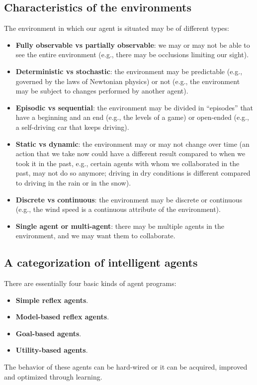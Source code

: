 \subsection{Characteristics of the environments}
The environment in which our agent is situated may be of different types:
\begin{itemize}
    \item \textbf{Fully observable vs partially observable}: we may or may not be able to see the entire environment (e.g., there may be occlusions limiting our sight).
    \item \textbf{Deterministic vs stochastic}: the environment may be predictable (e.g., governed by the laws of Newtonian physics) or not (e.g., the environment may be subject to changes performed by another agent).
    \item \textbf{Episodic vs sequential}: the environment may be divided in “episodes” that have a beginning and an end (e.g., the levels of a game) or open-ended (e.g., a self-driving car that keeps driving).
    \item \textbf{Static vs dynamic}: the environment may or may not change over time (an action that we take now could have a different result compared to when we took it in the past, e.g., certain agents with whom we collaborated in the past, may not do so anymore; driving in dry conditions is different compared to driving in the rain or in the snow).
    \item \textbf{Discrete vs continuous}: the environment may be discrete or continuous (e.g., the wind speed is a continuous attribute of the environment).
    \item \textbf{Single agent or multi-agent}: there may be multiple agents in the environment, and we may want them to collaborate.
\end{itemize}

\subsection{A categorization of intelligent agents}
There are essentially four basic kinds of agent programs:
\begin{itemize}
    \item \textbf{Simple reflex agents}.
    \item \textbf{Model-based reflex agents}.
    \item \textbf{Goal-based agents}.
    \item \textbf{Utility-based agents}.
\end{itemize}
The behavior of these agents can be hard-wired or it can be acquired, improved and optimized through learning.


